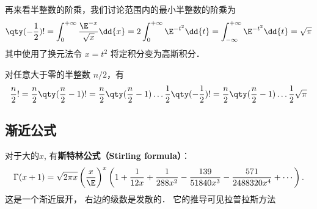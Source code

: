 再来看半整数的阶乘，我们讨论范围内的最小半整数的阶乘为 
\begin{equation}
\qty(-\frac12) ! = \int_0^{+\infty} \frac{\E^{-x}}{\sqrt x}\dd{x} = 2\int_0^{+\infty} \E^{-t^2} \dd{t} = \int_{-\infty}^{+\infty} \E^{-t^2} \dd{t} = \sqrt{\pi}
\end{equation}
其中使用了换元法令 $x = t^2$ 将定积分变为高斯积分．

对任意大于零的半整数 $n/2$，有
\begin{equation}
\frac{n}{2}! = \frac{n}{2} \qty(\frac{n}{2}-1)! = \frac{n}{2} \qty(\frac{n}{2}-1) \dots \frac12 \qty(-\frac12) ! = \frac{n}{2} \qty(\frac{n}{2}-1) \dots \frac12 \sqrt{\pi}
\end{equation}

\subsection{渐近公式}
对于大的$x$, 有\textbf{斯特林公式（Stirling formula）}：
$$
\Gamma(x+1)
  =\sqrt{2\pi x}\left({x\over \E}\right)^x
  \left(
   1
   +{1\over12x}
   +{1\over288x^2}
   -{139\over51840x^3}
   -{571\over2488320x^4}
   + \cdots
  \right).
$$
这是一个渐近展开， 右边的级数是发散的． 它的推导可见拉普拉斯方法
